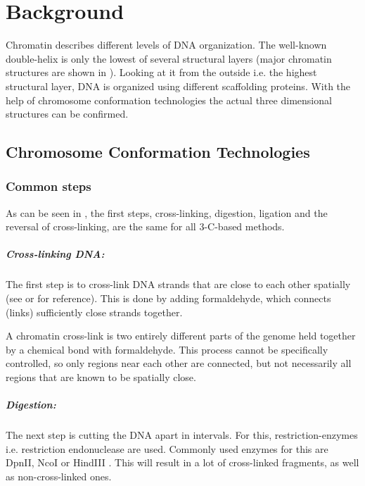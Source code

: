 \chapter{Background}\label{chap:background}

Chromatin describes different levels of DNA organization. The well-known
double-helix is only the lowest of several structural layers (major chromatin
structures are shown in ). Looking at it from the outside
i.e. the highest structural layer, DNA is organized using different scaffolding
proteins. With the help of chromosome conformation technologies the actual
three dimensional structures can be confirmed.


\section{Chromosome Conformation Technologies}\label{sec:cct}

\subsection{Common steps}\label{sec:common}

As can be seen in , the first steps, cross-linking, digestion,
ligation and the reversal of cross-linking, are the same for all 3-C-based methods.


\paragraph{Cross-linking DNA:}\label{sec:crosslinking}
The first step is to cross-link DNA strands that are close to each other
spatially (see  or  for reference). This is done by adding
formaldehyde, which connects (links) sufficiently close strands together.

A chromatin cross-link is two entirely different parts of the genome held
together by a chemical bond with formaldehyde. This process cannot be
specifically controlled, so only regions near each other are connected, but
not necessarily all regions that are known to be spatially close.




\paragraph{Digestion:}\label{sec:digestion}
The next step is cutting the DNA apart in intervals. For this,
restriction-enzymes i.e. restriction endonuclease are used. Commonly used
enzymes for this are DpnII, NcoI or HindIII \cite{lieberman2009comprehensive}.
This will result in a lot of cross-linked fragments, as well as
non-cross-linked ones.


